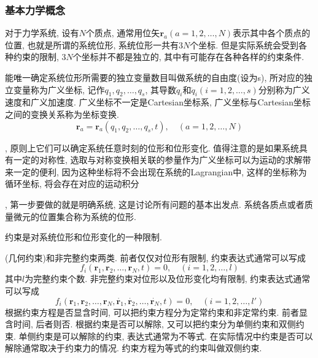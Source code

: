 \documentclass[a4paper,11pt]{article}
\theoremstyle{mystyle}
\begin{document}
\subsubsection{基本力学概念}
对于力学系统, 设有$N$个质点, 通常用位矢$\mathbf{r}_a(a=1,2,\dots,N)$表示其中各个质点的位置, 也就是所谓的系统位形, 系统位形一共有$3N$个坐标. 但是实际系统会受到各种约束的限制, $3N$个坐标并不都是独立的, 其中有可能存在各种各样的约束条件.
\begin{definition}[广义坐标]
  能唯一确定系统位形所需要的独立变量数目叫做系统的自由度(设为s), 所对应的独立变量称为广义坐标, 记作$q_1,q_2,\dots,q_s$, 其导数$\dot{q}_i$和$\ddot{q}_i(i=1,2,\dots,s)$分别称为广义速度和广义加速度. 广义坐标不一定是Cartesian坐标系, 广义坐标与Cartesian坐标之间的变换关系称为坐标变换.
\begin{equation*}
  \mathbf{r}_a=\mathbf{r}_a(q_1,q_2,\dots,q_s,t),\quad (a=1,2,\dots,N)
\end{equation*}
\end{definition}
, 原则上它们可以确定系统任意时刻的位形和位形变化. 值得注意的是如果系统具有一定的对称性, 选取与对称变换相关联的参量作为广义坐标可以为运动的求解带来一定的便利, 因为这种坐标将不会出现在系统的Lagrangian中, 这样的坐标称为循环坐标, 将会存在对应的运动积分

, 第一步要做的就是明确系统, 这是讨论所有问题的基本出发点. 系统各质点或者质量微元的位置集合称为系统的位形.
\begin{definition}[约束]
  约束是对系统位形和位形变化的一种限制.
\end{definition}
(几何约束)和非完整约束两类. 前者仅仅对位形有限制, 约束表达式通常可以写成
\begin{equation*}
  f_i(\mathbf{r}_1,\mathbf{r}_2,\dots,\mathbf{r}_N,t)=0,\quad (i=1,2,\dots,l)
\end{equation*}
其中$l$为完整约束个数. 非完整约束对位形以及位形变化均有限制, 约束表达式通常可以写成
\begin{equation*}
  f_i(\mathbf{r}_1,\mathbf{r}_2,\dots,\mathbf{r}_N,\dot{\mathbf{r}_1},\dot{\mathbf{r}_2},\dots,\dot{\mathbf{r}_N},t)=0,\quad(i=1,2,\dots,l')
\end{equation*}
根据约束方程是否显含时间, 可以把约束方程分为定常约束和非定常约束. 前者显含时间, 后者则否. 根据约束是否可以解除, 又可以把约束分为单侧约束和双侧约束. 单侧约束是可以解除的约束, 表达式通常为不等式. 在实际情况中约束是否可以解除通常取决于约束力的情况. 约束方程为等式的约束叫做双侧约束.
\end{document}
